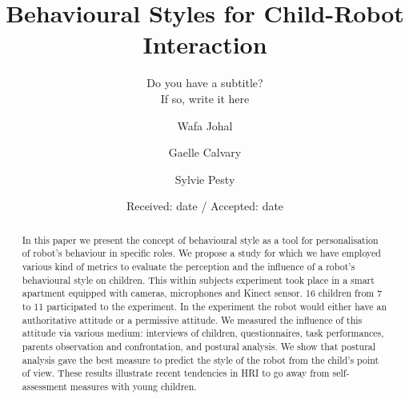 \documentclass[a4paper,twocolumn]{svjour3}
\begin{document}
\title{Behavioural Styles for Child-Robot Interaction%
}
\subtitle{Do you have a subtitle?\\ If so, write it here}


\author{Wafa Johal         \and
        Gaelle Calvary \and %
        Sylvie Pesty
}



\date{Received: date / Accepted: date}
\maketitle
\begin{abstract}
	In this paper we present the concept of behavioural style as a tool for personalisation of robot's behaviour in specific roles. 
	We propose a study for which we have employed various kind of metrics to evaluate the perception and the influence of a robot's behavioural style on children. 
	This within subjects experiment took place in a smart apartment equipped with cameras, microphones and Kinect sensor. 16 children from 7 to 11 participated to the experiment.
	In the experiment the robot would either have an authoritative attitude or a permissive attitude. 
	We measured the influence of this attitude via various medium:
	interviews of children, questionnaires, task performances, parents observation and confrontation, and postural analysis. 
	We show that postural analysis gave the best measure to predict the style of the robot from the child's point of view.
	These results illustrate recent tendencies in HRI to go away from self-assessment measures with young children.
\end{abstract}
\end{document}
